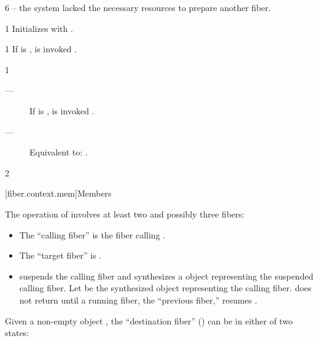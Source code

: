 6 \errors
{} -- the system lacked the necessary resources to prepare another fiber.


1 \effects
Initializes  with .


1 \effects
If \emptyfn is \false,  is invoked .


1 \effects
\begin{description}
    \item[---] If \emptyfn is \false,  is invoked .
    \item[---] Equivalent to: .
\end{description}

2 \returns
\this

[fiber.context.mem]{Members}

The operation of \resumewith involves at least two and possibly three fibers:

\begin{itemize}
    \item The ``calling fiber'' is the fiber calling \resumewith.
    \item The ``target fiber'' is \thefiber{\state}.
    \item \resumewith suspends the calling fiber and synthesizes
          a \fiber object representing the suspended calling fiber. Let
           be the synthesized \fiber object representing the
          calling fiber. \resumewith does not return until a running fiber, the
          ``previous fiber,'' resumes .
\end{itemize}

Given a non-empty \fiber object , the ``destination fiber''
() can be in either of two states:

